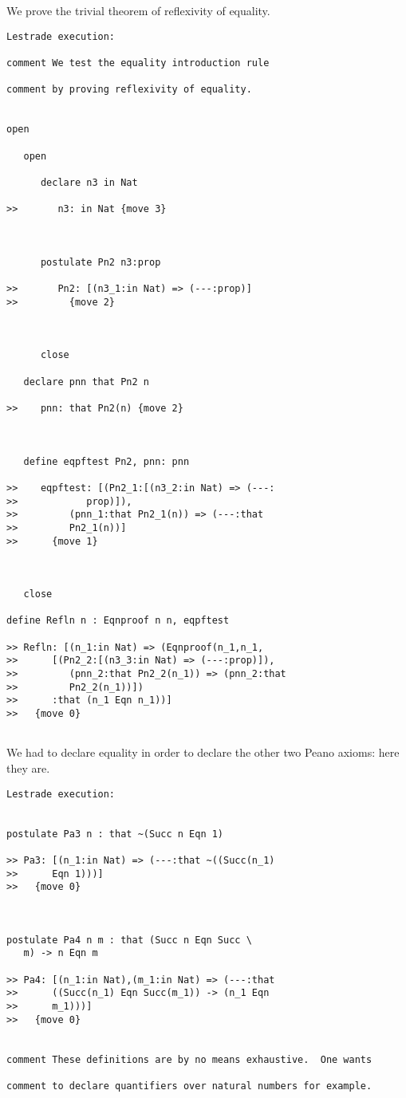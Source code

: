 \documentclass[12pt]{article}
\begin{document}
We prove the trivial theorem of reflexivity of equality.

\begin{verbatim}Lestrade execution:

comment We test the equality introduction rule

comment by proving reflexivity of equality.


open

   open

      declare n3 in Nat

>>       n3: in Nat {move 3}



      postulate Pn2 n3:prop

>>       Pn2: [(n3_1:in Nat) => (---:prop)]
>>         {move 2}



      close

   declare pnn that Pn2 n

>>    pnn: that Pn2(n) {move 2}



   define eqpftest Pn2, pnn: pnn

>>    eqpftest: [(Pn2_1:[(n3_2:in Nat) => (---:
>>            prop)]),
>>         (pnn_1:that Pn2_1(n)) => (---:that
>>         Pn2_1(n))]
>>      {move 1}



   close

define Refln n : Eqnproof n n, eqpftest

>> Refln: [(n_1:in Nat) => (Eqnproof(n_1,n_1,
>>      [(Pn2_2:[(n3_3:in Nat) => (---:prop)]),
>>         (pnn_2:that Pn2_2(n_1)) => (pnn_2:that
>>         Pn2_2(n_1))])
>>      :that (n_1 Eqn n_1))]
>>   {move 0}


\end{verbatim}

We had to declare equality in order to declare the other two Peano axioms:  here they are.

\begin{verbatim}Lestrade execution:


postulate Pa3 n : that ~(Succ n Eqn 1)

>> Pa3: [(n_1:in Nat) => (---:that ~((Succ(n_1)
>>      Eqn 1)))]
>>   {move 0}



postulate Pa4 n m : that (Succ n Eqn Succ \
   m) -> n Eqn m

>> Pa4: [(n_1:in Nat),(m_1:in Nat) => (---:that
>>      ((Succ(n_1) Eqn Succ(m_1)) -> (n_1 Eqn
>>      m_1)))]
>>   {move 0}


comment These definitions are by no means exhaustive.  One wants

comment to declare quantifiers over natural numbers for example.

\end{verbatim}
\end{document}
